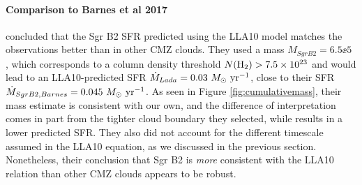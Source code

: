 \documentclass[twocolumn]{aastex61}
\begin{document}

\paragraph{Comparison to Barnes et al 2017}
\citet{Barnes2017b} concluded that the Sgr B2 SFR predicted using the LLA10
model matches the observations better than in other CMZ clouds.  They used a
mass $M_{Sgr B2}=6.5\ee{5}$ \msun, which corresponds to a column density
threshold $N(\textrm{H}_{2})>7.5\times10^{23}$ \persc and would lead to an LLA10-predicted SFR
$\dot{M}_{Lada}=0.03~M_{\odot}~\textrm{yr}^{-1}$, close to their SFR $\dot{M}_{Sgr B2,Barnes}
= 0.045~M_{\odot}~\textrm{yr}^{-1}$.  As seen in Figure \ref{fig:cumulativemass}, their mass
estimate is consistent with our own, and the difference of interpretation comes 
in part from the tighter cloud boundary they selected, while results in a lower
predicted SFR.  They also did not account for the different timescale assumed
in the LLA10 equation, as we discussed in the previous section.
Nonetheless, their conclusion that Sgr B2 is \emph{more} consistent with the LLA10
relation than other CMZ clouds appears to be robust.

\end{document}
